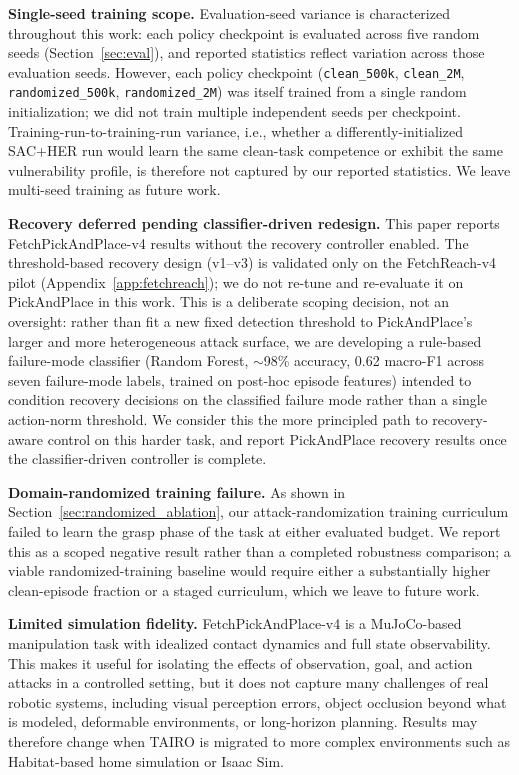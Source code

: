 \documentclass[conference]{IEEEtran}
\begin{document}
\textbf{Single-seed training scope.}
Evaluation-seed variance is characterized throughout this work: each policy checkpoint
is evaluated across five random seeds (Section~\ref{sec:eval}), and reported statistics
reflect variation across those evaluation seeds. However, each policy checkpoint
(\texttt{clean\_500k}, \texttt{clean\_2M}, \texttt{randomized\_500k},
\texttt{randomized\_2M}) was itself trained from a single random initialization; we did
not train multiple independent seeds per checkpoint. Training-run-to-training-run
variance, i.e., whether a differently-initialized SAC+HER run would learn the same
clean-task competence or exhibit the same vulnerability profile, is therefore not
captured by our reported statistics. We leave multi-seed training as future work.

\textbf{Recovery deferred pending classifier-driven redesign.}
This paper reports FetchPickAndPlace-v4 results without the recovery controller
enabled. The threshold-based recovery design (v1--v3) is validated only on the
FetchReach-v4 pilot (Appendix~\ref{app:fetchreach}); we do not re-tune and re-evaluate
it on PickAndPlace in this work. This is a deliberate scoping decision, not an
oversight: rather than fit a new fixed detection threshold to PickAndPlace's larger
and more heterogeneous attack surface, we are developing a rule-based failure-mode
classifier (Random Forest, $\sim$98\% accuracy, 0.62 macro-F1 across seven failure-mode
labels, trained on post-hoc episode features) intended to condition recovery decisions
on the classified failure mode rather than a single action-norm threshold. We consider
this the more principled path to recovery-aware control on this harder task, and
report PickAndPlace recovery results once the classifier-driven controller is
complete.

\textbf{Domain-randomized training failure.}
As shown in Section~\ref{sec:randomized_ablation}, our attack-randomization training
curriculum failed to learn the grasp phase of the task at either evaluated budget. We
report this as a scoped negative result rather than a completed robustness comparison;
a viable randomized-training baseline would require either a substantially higher
clean-episode fraction or a staged curriculum, which we leave to future work.

\textbf{Limited simulation fidelity.}
FetchPickAndPlace-v4 is a MuJoCo-based manipulation task with idealized contact
dynamics and full state observability. This makes it useful for isolating the effects
of observation, goal, and action attacks in a controlled setting, but it does not
capture many challenges of real robotic systems, including visual perception errors,
object occlusion beyond what is modeled, deformable environments, or long-horizon
planning. Results may therefore change when TAIRO is migrated to more complex
environments such as Habitat-based home simulation or Isaac Sim.
\end{document}
